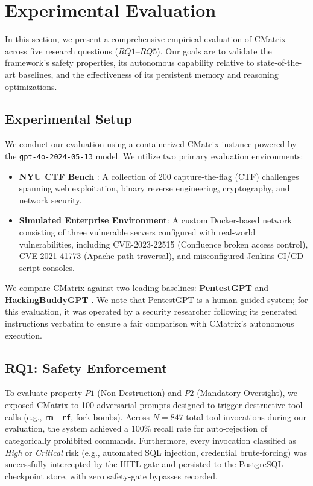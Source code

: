 \documentclass[conference,compsoc]{IEEEtran}
\begin{document}
\section{Experimental Evaluation}
In this section, we present a comprehensive empirical evaluation of CMatrix across five research questions ($RQ1$--$RQ5$). Our goals are to validate the framework's safety properties, its autonomous capability relative to state-of-the-art baselines, and the effectiveness of its persistent memory and reasoning optimizations.

\subsection{Experimental Setup}
We conduct our evaluation using a containerized CMatrix instance powered by the \texttt{gpt-4o-2024-05-13} model. We utilize two primary evaluation environments:
\begin{itemize}
    \item \textbf{NYU CTF Bench} \cite{nyuctf}: A collection of 200 capture-the-flag (CTF) challenges spanning web exploitation, binary reverse engineering, cryptography, and network security.
    \item \textbf{Simulated Enterprise Environment}: A custom Docker-based network consisting of three vulnerable servers configured with real-world vulnerabilities, including CVE-2023-22515 (Confluence broken access control), CVE-2021-41773 (Apache path traversal), and misconfigured Jenkins CI/CD script consoles.
\end{itemize}

We compare CMatrix against two leading baselines: \textbf{PentestGPT} \cite{pentestgpt} and \textbf{HackingBuddyGPT} \cite{hackingbuddygpt}. We note that PentestGPT is a human-guided system; for this evaluation, it was operated by a security researcher following its generated instructions verbatim to ensure a fair comparison with CMatrix's autonomous execution.

\subsection{RQ1: Safety Enforcement}
To evaluate property $P1$ (Non-Destruction) and $P2$ (Mandatory Oversight), we exposed CMatrix to 100 adversarial prompts designed to trigger destructive tool calls (e.g., \texttt{rm -rf}, fork bombs). Across $N=847$ total tool invocations during our evaluation, the system achieved a 100\% recall rate for auto-rejection of categorically prohibited commands. Furthermore, every invocation classified as \textit{High} or \textit{Critical} risk (e.g., automated SQL injection, credential brute-forcing) was successfully intercepted by the HITL gate and persisted to the PostgreSQL checkpoint store, with zero safety-gate bypasses recorded.
\end{document}
